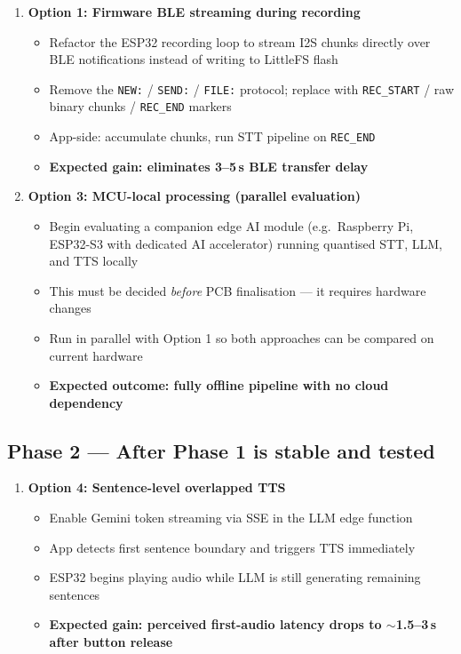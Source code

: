 \documentclass[12pt,a4paper]{article}
\begin{document}
\begin{enumerate}
  \item \textbf{Option 1: Firmware BLE streaming during recording}
  \begin{itemize}
    \item Refactor the ESP32 recording loop to stream I2S chunks directly over BLE notifications
          instead of writing to LittleFS flash
    \item Remove the \texttt{NEW:} / \texttt{SEND:} / \texttt{FILE:} protocol; replace with
          \texttt{REC\_START} / raw binary chunks / \texttt{REC\_END} markers
    \item App-side: accumulate chunks, run STT pipeline on \texttt{REC\_END}
    \item \textbf{Expected gain: eliminates 3--5\,s BLE transfer delay}
  \end{itemize}

  \item \textbf{Option 3: MCU-local processing (parallel evaluation)}
  \begin{itemize}
    \item Begin evaluating a companion edge AI module (e.g.\ Raspberry Pi, ESP32-S3 with
          dedicated AI accelerator) running quantised STT, LLM, and TTS locally
    \item This must be decided \emph{before} PCB finalisation — it requires hardware changes
    \item Run in parallel with Option 1 so both approaches can be compared on current hardware
    \item \textbf{Expected outcome: fully offline pipeline with no cloud dependency}
  \end{itemize}
\end{enumerate}

\subsection{Phase 2 — After Phase 1 is stable and tested}

\begin{enumerate}
  \item \textbf{Option 4: Sentence-level overlapped TTS}
  \begin{itemize}
    \item Enable Gemini token streaming via SSE in the LLM edge function
    \item App detects first sentence boundary and triggers TTS immediately
    \item ESP32 begins playing audio while LLM is still generating remaining sentences
    \item \textbf{Expected gain: perceived first-audio latency drops to $\sim$1.5--3\,s
          after button release}
  \end{itemize}
\end{enumerate}
\end{document}
